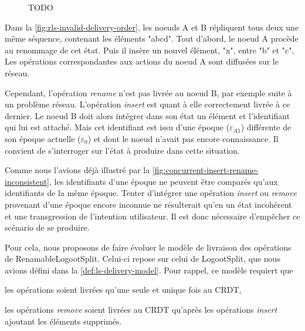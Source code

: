 \documentclass[12pt]{thesul}
\newcommand{\trm}[1]{\mathit{#1}}
\newcommand{\id}[3]{$\trm{#1}^{\trm{#2}}_{\trm{#3}}$}
\newcommand{\epoch}[1]{$\varepsilon_{#1}$}
\newcommand{\widthletter}{2em}
\begin{document}
\begin{figure}[!ht]
{
  }
  \caption{TODO}
  \label{fig:rls-invalid-delivery-order}
\end{figure}

Dans la \autoref{fig:rls-invalid-delivery-order}, les noeuds A et B répliquent tous deux une même séquence, contenant les éléments "abcd".
Tout d'abord, le noeud A procède au renommage de cet état.
Puis il insère un nouvel élément, "x", entre "b" et "c".
Les opérations correspondantes aux actions du noeud A sont diffusées sur le réseau.

Cependant, l'opération \emph{rename} n'est pas livrée au noeud B, par exemple suite à un problème réseau.
L'opération \emph{insert} est quant à elle correctement livrée à ce dernier.
Le noeud B doit alors intégrer dans son état un élément et l'identifiant qui lui est attaché.
Mais cet identifiant est issu d'une époque (\epoch{A1}) différente de son époque actuelle (\epoch{0}) et dont le noeud n'avait pas encore connaissance.
Il convient de s'interroger sur l'état à produire dans cette situation.

Comme nous l'avions déjà illustré par la \autoref{fig:concurrent-insert-rename-inconsistent}, les identifiants d'une époque ne peuvent être comparés qu'aux identifiants de la même époque.
Tenter d'intégrer une opération \emph{insert} ou \emph{remove} provenant d'une époque encore inconnue ne résulterait qu'en un état incohérent et une transgression de l'intention utilisateur.
Il est donc nécessaire d'empêcher ce scénario de se produire.

Pour cela, nous proposons de faire évoluer le modèle de livraison des opérations de RenamableLogootSplit.
Celui-ci repose sur celui de LogootSplit, que nous avions défini dans la \autoref{def:ls-delivery-model}.
Pour rappel, ce modèle requiert que
\begin{enumerate*}[label=(\roman*)]
  \item les opérations soient livrées qu'une seule et unique fois au \ac{CRDT},
  \item les opérations \emph{remove} soient livrées au \ac{CRDT} qu'après les opérations \emph{insert} ajoutant les éléments supprimés.
\end{enumerate*}
\end{document}
